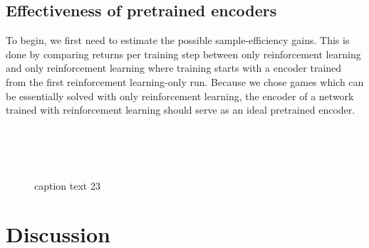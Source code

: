 \section{Effectiveness of pretrained encoders}
To begin, we first need to estimate the possible sample-efficiency gains.
This is done by comparing returns per training step between only reinforcement learning
and only reinforcement learning where training starts with a encoder
trained from the first reinforcement learning-only run.
Because we chose games which can be essentially solved with only reinforcement learning,
the encoder of a network trained with reinforcement learning should serve
as an ideal pretrained encoder.
\begin{figure}[!t]
  \captionsetup[subfloat]{position=top,labelformat=empty}
  \centering
  \subfloat[]{  \resizebox{0.4\textwidth}{!}{}} 
  \subfloat[]{  \resizebox{0.4\textwidth}{!}{}}\\
  \vspace{-1cm}
  \subfloat[]{  \resizebox{0.4\textwidth}{!}{}}
  \subfloat[]{  \resizebox{0.4\textwidth}{!}{}}\\
  \vspace{-1cm}
  \subfloat[]{  \resizebox{0.4\textwidth}{!}{}}
  \subfloat[]{  \resizebox{0.4\textwidth}{!}{}}\\
  \vspace{-1cm}
  \subfloat[]{  \resizebox{0.4\textwidth}{!}{}}
  \caption{caption text 23}
  \label{fig:compare}
\end{figure}



\chapter{Discussion}
